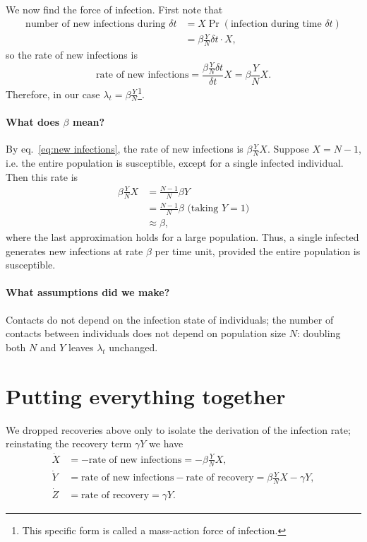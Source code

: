 We now find the force of infection. First note that
\begin{align*}
  \text{number of new infections during $\delta t$} &= X
  \Pr(\text{infection during time $\delta t$}) \\ &= \beta \frac{Y}{N}
  \delta t \cdot X,
\end{align*}
so the rate of new infections is
\begin{equation}\label{eq:new infections}
\text{rate of new infections} = \frac{\beta \frac{Y}{N} \delta
  t}{\delta t} X = \beta \frac{Y}{N} X.
\end{equation}
Therefore, in our case $\lambda_t = \beta \frac{Y}{N}$\footnote{This
specific form is called a mass-action force of infection.}.


\paragraph{What does $\beta$ mean?}
By eq.~\eqref{eq:new infections}, the rate of new infections is $\beta
\frac{Y}{N}X$.  Suppose $X= N-1$, i.e. the entire population is
susceptible, except for a single infected individual. Then this rate
is
\begin{align*}
  \beta \frac{Y}{N}X &= \frac{N-1}{N} \beta Y \\
  &= \frac{N-1}{N} \beta \text{ (taking $Y=1$)} \\
  &\approx \beta, 
\end{align*}
where the last approximation holds for a large population. Thus, a
single infected generates new infections at rate $\beta$ per time
unit, provided the entire population is susceptible.

\paragraph{What assumptions did we make?}
Contacts do not depend on the infection state of
individuals; the number of contacts between individuals does not
depend on population size $N$: doubling both $N$ and $Y$ leaves
$\lambda_t$ unchanged.


\section{Putting everything together}
We dropped recoveries above only to isolate the derivation of the
infection rate; reinstating the recovery term $\gamma Y$ we have
\begin{align*}
\dot{X} &= -\text{rate of new infections} = -\beta \frac{Y}{N} X, \\
\dot{Y} &= \text{rate of new infections} - \text{rate of recovery} = \beta\frac{Y}{N}X - \gamma Y, \\
\dot{Z} &= \text{rate of recovery} = \gamma Y.
\end{align*}

